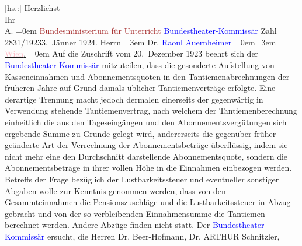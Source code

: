            \pstart
           {[}hs.:{]} Herzlichst{\\[\baselineskip]}Ihr{\\[\baselineskip]}\spacefill\mbox{A.}\pend
           \leftskip=0em{}{\bigskip}\pstart
           \noindent{}\raggedleft{}{\pb}\textcolor{brown}{Bundesministerium für Unterricht}{}\ledrightnote{\textcolor{brown}{Ministerium für Unterricht}}\pend
           \pstart
           \noindent{}\raggedleft{}\textcolor{blue}{Bundestheater-Kommissär}{}\pend
           \pstart
           \noindent{}Zahl 2831/1923\hfill 3. Jänner 1924.\pend
           \pstart
           Herrn\pend
           \leftskip=3em{}\pstart
           \noindent{}Dr. \textcolor{blue}{Raoul Auernheimer}{}\ledrightnote{\textcolor{blue}{Raoul Auernheimer}}\pend
           \leftskip=0em{}\leftskip=3em{}\pstart
           \uline{\textcolor{pink}{Wien}{}\ledrightnote{\textcolor{pink}{Wien}}.}\pend
           \leftskip=0em{}\pstart
           Auf die Zuschrift vom 20. Dezember 1923 beehrt sich der \textcolor{blue}{Bundestheater-Kommissär}{}
               mitzuteilen, dass die gesonderte Aufstellung von Kasseneinnahmen und
               Abonnementsquoten in den Tantiemenabrechnungen der früheren Jahre auf Grund damals
               üblicher Tantiemenverträge erfolgte. Eine derartige Trennung macht jedoch dermalen
               einerseits der gegenwärtig in Verwendung stehende Tantiemenvertrag, nach welchem der
               Tantiemenberechnung einheitlich die aus den Tageseingängen und den
               Abonnementsvergütungen sich ergebende Summe zu Grunde gelegt wird, andererseits die
               gegenüber früher geänderte Art der Verrechnung der Abonnementsbeträge überflüssig,
                  {\pb}indem sie nicht mehr eine den Durchschnitt
               darstellende  Abonnementsquote, sondern die
               Abonnementsbeträge in ihrer vollen Höhe in die Einnahmen einbezogen werden.\pend
           \pstart
           Betreffs der Frage bezüglich der Lustbarkeitssteuer und eventueller sonstiger Abgaben
               wolle zur Kenntnis genommen werden, dass von den Gesammteinnahmen die
               Pensionszuschläge und die Lustbarkeitssteuer in Abzug gebracht und von der so
               verbleibenden Einnahmensumme die Tantiemen berechnet werden. Andere Abzüge finden
               nicht statt.\pend
           \pstart
           Der \textcolor{blue}{Bundestheater-Kommissär}{}
               ersucht, die Herren Dr. Beer-Hofmann, Dr. ARTHUR Schnitzler,
